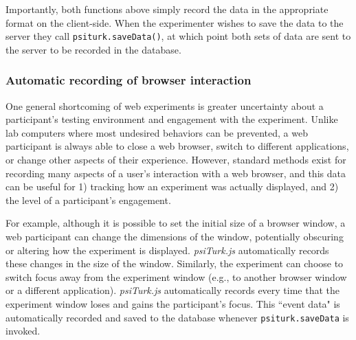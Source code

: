 \documentclass[twocolumn]{svjour3}          %
\begin{document}
Importantly, both functions above simply record the data in the appropriate format on the client-side.
When the experimenter wishes to save the data to the server they call \texttt{psiturk.saveData()}, at which point both sets of data are sent to the server to be recorded in the database.

\subsubsection{Automatic recording of browser interaction}
 
One general shortcoming of web experiments is greater uncertainty about a participant's testing environment and engagement with the experiment.
Unlike lab computers where most undesired behaviors can be prevented, a web participant is always able to close a web browser, switch to different applications, or change other aspects of their experience.
However, standard methods exist for recording many aspects of a user's interaction with a web browser, and this data can be useful for 1) tracking how an experiment was actually displayed, and 2) the level of a participant's engagement.

For example, although it is possible to set the initial size of a browser window, a web participant can change the dimensions of the window, potentially obscuring or altering how the experiment is displayed.
\emph{psiTurk.js} automatically records these changes in the size of the window.
Similarly, the experiment can choose to switch focus away from the experiment window (e.g., to another browser window or a different application).
\emph{psiTurk.js} automatically records every time that the experiment window loses and gains the participant's focus.
This ``event data" is automatically recorded and saved to the database whenever \texttt{psiturk.saveData} is invoked. \\
\end{document}
